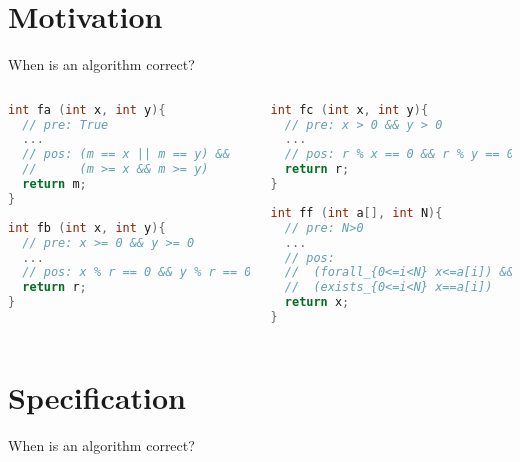 \documentclass[aspectratio=169]{beamer}
\begin{document}
\frame[plain]{\titlepage}


\section{Motivation}


\begin{frame}[fragile]{When is an algorithm correct?}
~\\[-8mm]
\begin{columns}
\begin{column}{0.48\textwidth}
\begin{lstlisting}[language=C++]
int fa (int x, int y){
  // pre: True
  ...
  // pos: (m == x || m == y) &&
  //      (m >= x && m >= y)
  return m;
}
\end{lstlisting}
\begin{lstlisting}[language=C++]
int fb (int x, int y){
  // pre: x >= 0 && y >= 0
  ...
  // pos: x % r == 0 && y % r == 0
  return r;
}
\end{lstlisting}
\end{column}
\begin{column}{0.48\textwidth}
\begin{lstlisting}[language=C++]
int fc (int x, int y){
  // pre: x > 0 && y > 0
  ...
  // pos: r % x == 0 && r % y == 0
  return r;
}
\end{lstlisting}
\begin{lstlisting}[language=C++]
int ff (int a[], int N){
  // pre: N>0
  ...
  // pos:
  //  (forall_{0<=i<N} x<=a[i]) &&
  //  (exists_{0<=i<N} x==a[i])
  return x;
}
\end{lstlisting}
\end{column}
\end{columns}
\end{frame}


\section{Specification}

\begin{frame}{When is an algorithm correct?}
\end{frame}
\end{document}
